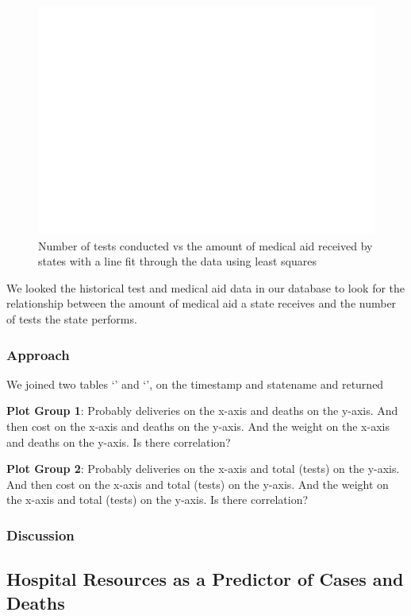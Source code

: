 \documentclass[11pt]{article}
\begin{document}
\FloatBarrier
\begin{figure}[h]
    \centering
    \includegraphics[scale=0.5]{diagrams/analysis/medaid_corr_outliers.png}
    \caption{Number of tests conducted vs the amount of medical aid received by states with a line fit through the data using least squares}
    \label{fig:test_cost_fit}
\end{figure}
\FloatBarrier

\noindent
We looked the historical test and medical aid data in our database to look for the relationship between the amount of medical aid a state receives and the number of tests the state performs. 

\subsubsection{Approach}
We joined two tables `' and `', on the timestamp and statename and returned 


\noindent
\textbf{Plot Group 1}: Probably deliveries on the x-axis and deaths on the y-axis. And then cost on the x-axis and deaths on the y-axis. And the weight on the x-axis and deaths on the y-axis. Is there correlation?

\noindent
\textbf{Plot Group 2}: Probably deliveries on the x-axis and total (tests) on the y-axis. And then cost on the x-axis and total (tests) on the y-axis. And the weight on the x-axis and total (tests) on the y-axis. Is there correlation?


\subsubsection{Discussion}

\pagebreak

\subsection{Hospital Resources as a Predictor of Cases and Deaths}
\end{document}
